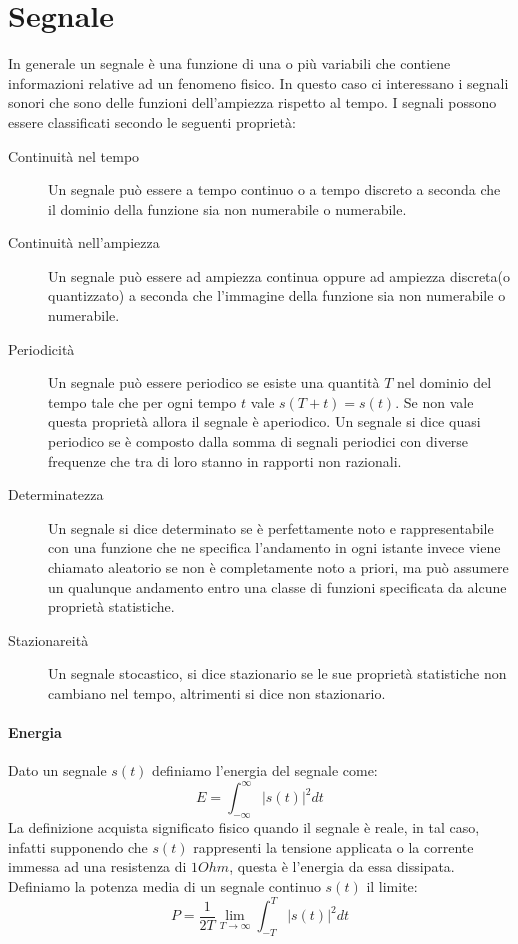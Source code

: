 \section{Segnale}
In generale un segnale \`e una funzione di una o pi\`u variabili che contiene informazioni relative ad un fenomeno fisico. In questo caso ci interessano i segnali sonori che sono delle funzioni dell'ampiezza rispetto al tempo. 
I segnali possono essere classificati secondo le seguenti propriet\`a:
\begin{description}
  \item[Continuit\`a nel tempo]
    Un segnale pu\`o essere a tempo continuo o a tempo discreto a seconda che il dominio della funzione sia non numerabile o numerabile.
  \item[Continuit\`a nell'ampiezza]
    Un segnale pu\`o essere ad ampiezza continua oppure ad ampiezza discreta(o quantizzato) a seconda che l'immagine della funzione sia non numerabile o numerabile.
  \item[Periodicit\`a]
    Un segnale pu\`o essere periodico se esiste una quantit\`a $T$ nel dominio del tempo tale che per ogni tempo $t$ vale $s(T+t)=s(t)$. Se non vale questa propriet\`a allora il segnale \`e aperiodico. 
    Un segnale si dice quasi periodico se \`e composto dalla somma di segnali periodici con diverse frequenze che tra di loro stanno in rapporti non razionali. 
  \item[Determinatezza]
    Un segnale si dice determinato se \`e perfettamente noto e rappresentabile con una funzione che ne specifica l'andamento in ogni istante invece viene chiamato aleatorio se non \`e completamente noto a priori, ma pu\`o assumere un qualunque andamento entro una classe di funzioni specificata da alcune propriet\`a statistiche.
  \item[Stazionareit\`a]
    Un segnale stocastico, si dice stazionario se le sue propriet\`a statistiche non cambiano nel tempo, altrimenti si dice non stazionario.
\end{description}



\paragraph{Energia}
Dato un segnale $s(t)$ definiamo l'energia del segnale come:
\[
  E=\int_{-\infty}^{\infty} |s(t)|^{2}dt
\]
La definizione acquista significato fisico quando il segnale \`e reale, in tal caso, infatti supponendo che $s(t)$ rappresenti la tensione applicata o la corrente immessa ad una resistenza di $1Ohm$, questa \`e l'energia da essa dissipata. 
Definiamo la potenza media di un segnale continuo $s(t)$ il limite:
\[
  P=\frac{1}{2T} \lim_{T\rightarrow \infty} \int_{-T}^{T} |s(t)|^{2}dt
\]

